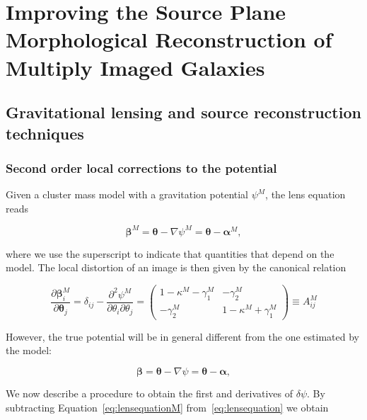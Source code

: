 
\chapter{Improving the Source Plane Morphological Reconstruction of Multiply Imaged Galaxies}

\section{Gravitational lensing and source reconstruction techniques}\label{sec:model}

\subsection{Second order local corrections to the potential}

Given a cluster mass model with a gravitation potential $\psi^M$, the lens equation reads

\begin{equation}
\boldsymbol \beta^M=\boldsymbol \theta-\nabla \psi^M = \boldsymbol \theta - \boldsymbol \alpha^M,
\label{eq:lensequationM}
\end{equation}

where we use the superscript to indicate that quantities that depend on the model. The local distortion of an image is then given by the canonical relation

\begin{equation}
\frac{\partial \boldsymbol \beta_i^M}{\partial \boldsymbol \theta_j}=\delta_{ij}-\frac{\partial^2 \psi^M}{\partial \theta_i \partial \theta_j}=\left(\begin{array}{cc} 1-\kappa^M-\gamma_1^M & -\gamma_2^M \\
-\gamma_2^M & 1-\kappa^M+\gamma_1^M \end{array} \right) \equiv A_{ij}^M
\label{eq:magnification}
\end{equation}

However, the true potential will be in general different from the one estimated by the model:

\begin{equation}
\boldsymbol \beta=\boldsymbol \theta-\nabla \psi = \boldsymbol \theta - \boldsymbol \alpha,
\label{eq:lensequation}
\end{equation}

We now describe a procedure to obtain the first and derivatives of
$\delta \psi$. By subtracting Equation~\ref{eq:lensequationM}
from~\ref{eq:lensequation} we obtain

